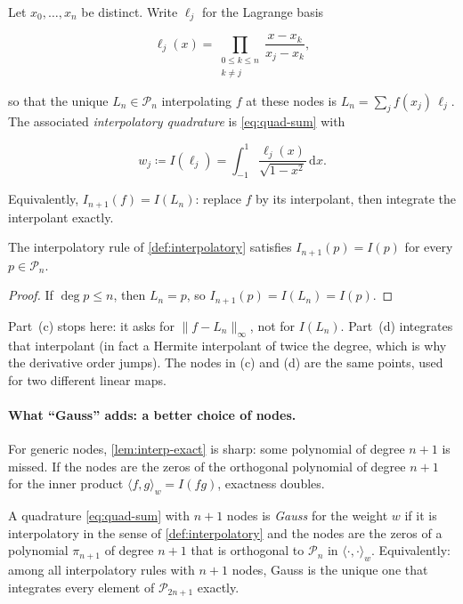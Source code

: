 \begin{definition}
\label{def:interpolatory}
Let \(x_{0},\ldots,x_{n}\) be distinct. Write \(\ell_{j}\) for the Lagrange basis

\[
\ell_{j}(x)
=
\prod_{\substack{0\le k\le n\\ k\neq j}}
\frac{x-x_{k}}{x_{j}-x_{k}},
\]

so that the unique \(L_{n}\in\mathcal{P}_{n}\) interpolating \(f\) at these nodes is \(L_{n}=\sum_{j} f(x_{j})\,\ell_{j}\). The associated \emph{interpolatory quadrature} is \eqref{eq:quad-sum} with

\[
w_{j}
\coloneqq
I(\ell_{j})
=
\int_{-1}^{1}
\frac{\ell_{j}(x)}{\sqrt{1-x^{2}}}\,
\mathrm{d}x.
\]

Equivalently, \(I_{n+1}(f)=I(L_{n})\): replace \(f\) by its interpolant, then integrate the interpolant exactly.
\end{definition}

\begin{lemma}
\label{lem:interp-exact}
The interpolatory rule of \cref{def:interpolatory} satisfies \(I_{n+1}(p)=I(p)\) for every \(p\in\mathcal{P}_{n}\).
\end{lemma}

\begin{proof}
If \(\deg p\le n\), then \(L_{n}=p\), so \(I_{n+1}(p)=I(L_{n})=I(p)\).
\end{proof}

Part~(c) stops here: it asks for \(\|f-L_{n}\|_{\infty}\), not for \(I(L_{n})\). Part~(d) integrates that interpolant (in fact a Hermite interpolant of twice the degree, which is why the derivative order jumps). The nodes in (c) and (d) are the same points, used for two different linear maps.

\paragraph{What ``Gauss'' adds: a better choice of nodes.}

For generic nodes, \cref{lem:interp-exact} is sharp: some polynomial of degree \(n+1\) is missed. If the nodes are the zeros of the orthogonal polynomial of degree \(n+1\) for the inner product \(\langle f,g\rangle_{w}=I(fg)\), exactness doubles.

\begin{definition}
\label{def:gauss}
A quadrature \eqref{eq:quad-sum} with \(n+1\) nodes is \emph{Gauss} for the weight \(w\) if it is interpolatory in the sense of \cref{def:interpolatory} and the nodes are the zeros of a polynomial \(\pi_{n+1}\) of degree \(n+1\) that is orthogonal to \(\mathcal{P}_{n}\) in \(\langle\cdot,\cdot\rangle_{w}\). Equivalently: among all interpolatory rules with \(n+1\) nodes, Gauss is the unique one that integrates every element of \(\mathcal{P}_{2n+1}\) exactly.
\end{definition}


